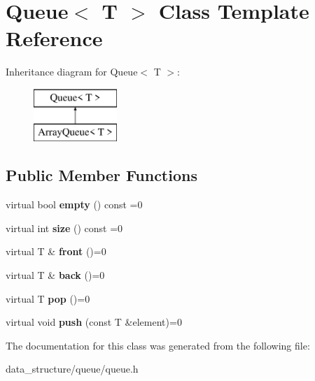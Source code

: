 \hypertarget{classQueue}{}\section{Queue$<$ T $>$ Class Template Reference}
\label{classQueue}
Inheritance diagram for Queue$<$ T $>$\+:\begin{figure}[H]
\begin{center}
\leavevmode
\includegraphics[height=2.000000cm]{classQueue}
\end{center}
\end{figure}
\subsection*{Public Member Functions}
\begin{DoxyCompactItemize}
\item 
\mbox{\label{classQueue_a5b1556252d112e340c96b73f1e5a9836}} 
virtual bool {\bfseries empty} () const =0
\item 
\mbox{\label{classQueue_a57c59f0de878241b175803359b1da05e}} 
virtual int {\bfseries size} () const =0
\item 
\mbox{\label{classQueue_af0901eae22d8c66141e114b45392ec32}} 
virtual T \& {\bfseries front} ()=0
\item 
\mbox{\label{classQueue_a32e02644d90c190c69fb693c81fc3237}} 
virtual T \& {\bfseries back} ()=0
\item 
\mbox{\label{classQueue_a6c162a551ebcdc53e53d6895aac541c1}} 
virtual T {\bfseries pop} ()=0
\item 
\mbox{\label{classQueue_a8fa3be99d4c44e7b439327a37b4b23c9}} 
virtual void {\bfseries push} (const T \&element)=0
\end{DoxyCompactItemize}


The documentation for this class was generated from the following file\+:\begin{DoxyCompactItemize}
\item 
data\+\_\+structure/queue/queue.\+h\end{DoxyCompactItemize}
